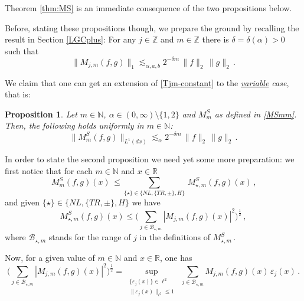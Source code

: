 \documentclass[a4paper,reqno]{amsart}
\numberwithin{equation}{section}
\newtheorem{proposition}[theorem]{Proposition}
\theoremstyle{definition}
\newcommand{\R}{\mathbb{R}}
\newcommand{\Z}{\mathbb{Z}}
\newcommand{\N}{\mathbb{N}}
\newcommand{\e}{\varepsilon}
\def\a{\alpha}
\def\B{\mathcal{B}}
\begin{document}
Theorem \ref{thm:MS} is an immediate consequence of the two propositions below.

Before, stating these propositions though, we prepare the ground by recalling the result in Section \ref{LGCplus}: For any $j\in\Z$ and $m\in\Z$ there is $\delta=\delta(\a)>0$ such that
\begin{equation}\label{Tjm-constant}
	\|M_{j,m}(f,g)\|_1\lesssim_{\a,a,b} 2^{-\delta m}\,\|f\|_2\,\|g\|_2\,.
\end{equation}

We claim that one can get an extension of \eqref{Tjm-constant} to the \emph{\underline{variable} case}, that is:

\begin{proposition}\label{prop:MS2}
	Let $m\in\N$, $\a\in (0,\infty)\setminus\{1,2\}$ and $M_m^S$ as defined in \eqref{MSmm}. Then, the following holds uniformly in $m\in\N$:
	\begin{equation}
		\|M_m^S(f,g)\|_{L^1(dx)}\lesssim_{\a} 2^{-\delta m}\, \|f\|_2\,\|g\|_2\,.
	\end{equation}
\end{proposition}


In order to state the second proposition we need yet some more preparation: we first notice that for each $m\in\N$ and $x\in\R$
\begin{equation*}
	\,M^S_m(f,g)(x)\,\le \sum_{\{\star\}\in\{NL,\{TR,\pm\},H\}}\,M^S_{\star,m}(f,g)(x)\,,
\end{equation*}
and given $\{\star\}\in\{NL,\{TR,\pm\},H\}$ we have
\begin{equation*}\label{MSstarm-l2bound}
	M^S_{\star,m}(f,g)(x)\le\Big(\sum_{j\in\B_{\star,m}} |M_{j,m}(f,g)(x)|^2\Big)^{\frac12}\,,
\end{equation*}
where $\B_{\star,m}$ stands for the range of $j$ in the definitions of $M^{S}_{\star,m}$\,.

Now, for a given value of $m\in\N$ and $x\in\R$, one has
\begin{equation*}
	\Big(\sum_{j\in\B_{\star,m}} |M_{j,m}(f,g)(x)|^2\Big)^{\frac12} =\sup_{\substack{\{\e_j(x)\}\in\ell^2\\ \|\e_j(x)\|_{\ell^2}\le 1}}\: \sum_{j\in \B_{\star,m}} M_{j,m}(f,g)(x)\,\e_j(x)\,.
\end{equation*}
\end{document}
